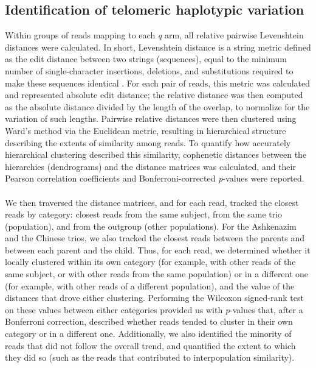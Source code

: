 \documentclass{article}
\begin{document}
\subsection*{Identification of telomeric haplotypic variation}
    Within groups of reads mapping to each \textit{q} arm, all relative pairwise Levenshtein distances were calculated.
    In short, Levenshtein distance is a string metric defined as the edit distance between two strings (sequences),
        equal to the minimum number of single-character insertions, deletions, and substitutions
            required to make these sequences identical \parencite{levenshtein}.
    For each pair of reads, this metric was calculated and represented absolute edit distance;
        the relative distance was then computed as the absolute distance divided by the length of the overlap,
            to normalize for the variation of such lengths.
    Pairwise relative distances were then clustered using Ward's method via the Euclidean metric,
        resulting in hierarchical structure describing the extents of similarity among reads.
    To quantify how accurately hierarchical clustering described this similarity,
        cophenetic distances \parencite{cophenetic} between the hierarchies (dendrograms) and the distance matrices was calculated,
        and their Pearson correlation coefficients and Bonferroni-corrected \textit{p}-values were reported.
    \\~\\
    We then traversed the distance matrices,
        and for each read, tracked the closest reads by category:
            closest reads from the same subject,
            from the same trio (population),
            and from the outgroup (other populations).
        For the Ashkenazim and the Chinese trios, we also tracked the closest reads
            between the parents
            and between each parent and the child.
        Thus, for each read, we determined whether it locally clustered
            within its own category
                (for example, with other reads of the same subject, or with other reads from the same population)
            or in a different one
                (for example, with other reads of a different population),
            and the value of the distances that drove either clustering.
        Performing the Wilcoxon signed-rank test on these values between either categories
            provided us with \textit{p}-values that, after a Bonferroni correction,
            described whether reads tended to cluster in their own category or in a different one.
        Additionally, we also identified the minority of reads that did not follow the overall trend,
            and quantified the extent to which they did so
                (such as the reads that contributed to interpopulation similarity).
\end{document}
